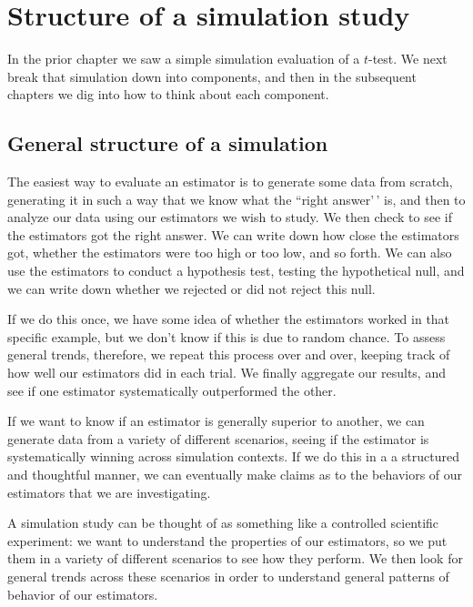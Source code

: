 \documentclass[
]{book}
\begin{document}
\hypertarget{structure-of-a-simulation-study}{%
\chapter{Structure of a simulation study}\label{structure-of-a-simulation-study}}

In the prior chapter we saw a simple simulation evaluation of a \(t\)-test.
We next break that simulation down into components, and then in the subsequent chapters we dig into how to think about each component.

\hypertarget{general-structure-of-a-simulation}{%
\section{General structure of a simulation}\label{general-structure-of-a-simulation}}

The easiest way to evaluate an estimator is to generate some data from scratch, generating it in such a way that we know what the ``right answer'\,' is, and then to analyze our data using our estimators we wish to study.
We then check to see if the estimators got the right answer. We can write down how close the estimators got, whether the estimators were too high or too low, and so forth.
We can also use the estimators to conduct a hypothesis test, testing the hypothetical null, and we can write down whether we rejected or did not reject this null.

If we do this once, we have some idea of whether the estimators worked in that specific example, but we don't know if this is due to random chance.
To assess general trends, therefore, we repeat this process over and over, keeping track of how well our estimators did in each trial.
We finally aggregate our results, and see if one estimator systematically outperformed the other.

If we want to know if an estimator is generally superior to another, we can generate data from a variety of different scenarios, seeing if the estimator is systematically winning across simulation contexts. If we do this in a a structured and thoughtful manner, we can eventually make claims as to the behaviors of our estimators that we are investigating.

A simulation study can be thought of as something like a controlled scientific experiment: we want to understand the properties of our estimators, so we put them in a variety of different scenarios to see how they perform. We then look for general trends across these scenarios in order to understand general patterns of behavior of our estimators.
\end{document}
